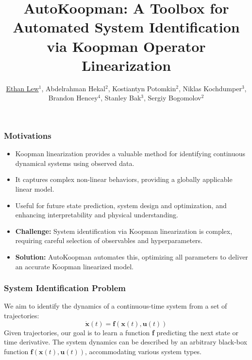 \documentclass[shortpres,aspectratio=43]{beamer}
\title[AutoKoopman]{AutoKoopman: A Toolbox for Automated System Identification via Koopman Operator Linearization}
\author[Lew et al.]{\underline{Ethan Lew}$^1$, Abdelrahman Hekal$^2$, Kostiantyn Potomkin$^2$, Niklas Kochdumper$^3$, Brandon Hencey$^4$, Stanley Bak$^3$, Sergiy Bogomolov$^2$}
\institute[Galois Inc.]{$^1$Galois Inc., $^2$Newcastle University, \\$^3$ Stony Brook University, $^4$Air Force Research Laboratory}
\date[ATVA 2023]{}
\begin{document}


\begin{frame}[plain]
    \titlepage
\end{frame}

\begin{frame}
\frametitle{Motivations}
\begin{itemize}
    \item<1-> Koopman linearization provides a valuable method for identifying continuous dynamical systems using observed data.
    \item<2-> It captures complex non-linear behaviors, providing a globally applicable linear model.
    \item<3-> Useful for future state prediction, system design and optimization, and enhancing interpretability and physical understanding.
    \item<4-> \textbf{Challenge:} System identification via Koopman linearization is complex, requiring careful selection of observables and hyperparameters.
    \item<5-> \textbf{Solution:} AutoKoopman automates this, optimizing all parameters to deliver an accurate Koopman linearized model.
\end{itemize}
\end{frame}

\begin{frame}
\frametitle{System Identification Problem}
We aim to identify the dynamics of a continuous-time system from a set of trajectories:
\begin{equation}
\dot{\mathbf{x}}(t) = \mathbf{f}(\mathbf{x}(t), \mathbf{u}(t))
\end{equation}
\pause
Given trajectories, our goal is to learn a function \textbf{f} predicting the next state or time derivative. The system dynamics can be described by an arbitrary black-box function $\mathbf{f}(\mathbf{x}(t), \mathbf{u}(t))$, accommodating various system types.
\end{frame}
\end{document}
